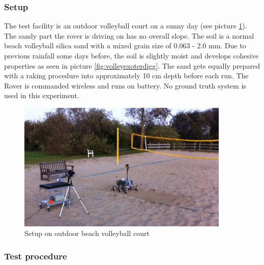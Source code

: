 \documentclass[a4paper,twocolumn]{esapub2005} %
\begin{document}
\subsubsection{Setup}
The test facility is an outdoor volleyball court on a sunny day (see picture \ref{fig:volley}). The sandy part the rover is driving on has no overall slope. The soil is a normal beach volleyball silica sand with a mixed grain size of 0.063 - 2.0 mm. Due to previous rainfall some days before, the soil is slightly moist and develops cohesive properties as seen in picture \ref{fig:volleyexoterdigg}. The sand gets equally prepared with a raking procedure into approximately 10 cm depth before each run.
The Rover is commanded wireless and runs on battery. No ground truth system is used in this experiment. 


\begin{figure}[h!]
	\centering		\includegraphics[width=0.9\textwidth]{volley.JPG}	
	\caption{Setup on outdoor beach volleyball court}
	\label{fig:volley}
\end{figure}



\subsubsection{Test procedure}
\end{document}
